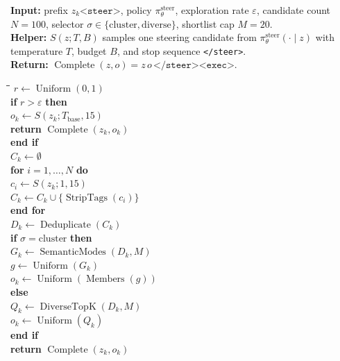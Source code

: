 \documentclass[10pt,twocolumn]{article}
\begin{document}
\begin{algorithm}[H]
  \caption{Decision-point \(\varepsilon\)-greedy steering}
  \label{alg:decision-point-epsilon}
  \small
  \begin{minipage}{\linewidth}
    \textbf{Input:} prefix
    \(z_k\texttt{<steer>}\), policy
    \(\pi_\theta^{\mathrm{steer}}\), exploration rate \(\varepsilon\),
    candidate count \(N=100\), selector \(\sigma\in
    \{\mathrm{cluster},\mathrm{diverse}\}\), shortlist cap
    \(M=20\).\\
    \textbf{Helper:} \(S(z;T,B)\) samples one steering candidate from
    \(\pi_\theta^{\mathrm{steer}}(\cdot\mid z)\) with temperature \(T\), budget
    \(B\), and stop sequence \texttt{</steer>}.\\
    \textbf{Return:} \(\operatorname{Complete}(z,o)=
    z\,o\,\texttt{</steer><exec>}\).

    \begin{tabbing}
      \quad\=\quad\=\quad\=\kill
      \(r \leftarrow \operatorname{Uniform}(0,1)\)\\
      \textbf{if} \(r > \varepsilon\) \textbf{then}\\
      \> \(o_k \leftarrow S(z_k;T_{\mathrm{base}},15)\)\\
      \> \textbf{return} \(\operatorname{Complete}(z_k,o_k)\)\\
      \textbf{end if}\\[0.2em]
      \(C_k \leftarrow \emptyset\)\\
      \textbf{for} \(i=1,\ldots,N\) \textbf{do}\\
      \> \(c_i \leftarrow S(z_k;1,15)\)\\
      \> \(C_k \leftarrow C_k \cup \{\operatorname{StripTags}(c_i)\}\)\\
      \textbf{end for}\\[0.2em]
      \(D_k \leftarrow \operatorname{Deduplicate}(C_k)\)\\
      \textbf{if} \(\sigma=\mathrm{cluster}\)
      \textbf{then}\\
      \> \(G_k \leftarrow \operatorname{SemanticModes}(D_k,M)\)\\
      \> \(g \leftarrow \operatorname{Uniform}(G_k)\)\\
      \> \(o_k \leftarrow \operatorname{Uniform}(\operatorname{Members}(g))\)\\
      \textbf{else}\\
      \> \(Q_k \leftarrow \operatorname{DiverseTopK}(D_k,M)\)\\
      \> \(o_k \leftarrow \operatorname{Uniform}(Q_k)\)\\
      \textbf{end if}\\
      \textbf{return} \(\operatorname{Complete}(z_k,o_k)\)
    \end{tabbing}
  \end{minipage}
\end{algorithm}
\end{document}
